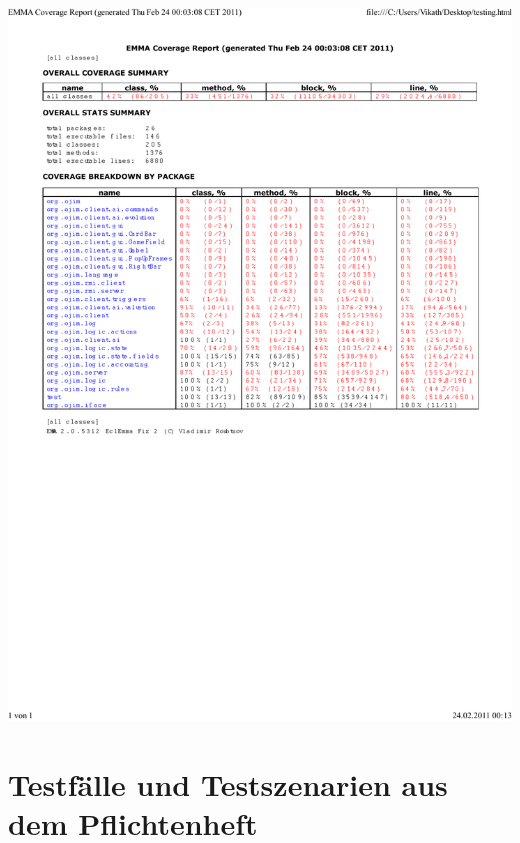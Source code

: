 \documentclass[a4paper,10pt]{article}
\begin{document}
\includegraphics[width=17cm]{EMMA} \\

\section{Testfälle und Testszenarien aus dem Pflichtenheft}
\end{document}
